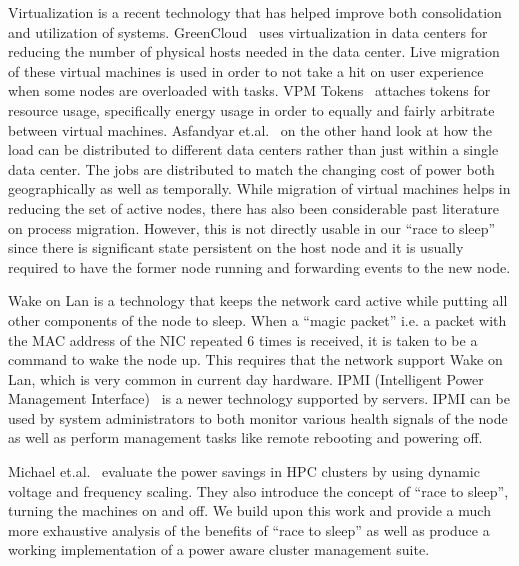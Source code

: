 Virtualization is a recent technology that has helped improve both consolidation and utilization of systems. GreenCloud~\cite{Liu:09} uses virtualization in data centers for reducing the number of physical hosts needed in the data center. Live migration of these virtual machines is used in order to not take a hit on user experience when some nodes are overloaded with tasks. VPM Tokens~\cite{Ripal:08} attaches tokens for resource usage, specifically energy usage in order to equally and fairly arbitrate between virtual machines. Asfandyar et.al.~\cite{Asfandyar:09} on the other hand look at how the load can be distributed to different data centers rather than just within a single data center. The jobs are distributed to match the changing cost of power both geographically as well as temporally. While migration of virtual machines helps in reducing the set of active nodes, there has also been considerable past literature~\cite{tcpcp, mosix} on process migration. However, this is not directly usable in our ``race to sleep'' since there is significant state persistent on the host node and it is usually required to have the former node running and forwarding events to the new node.

Wake on Lan\cite{wol,irwt} is a technology that keeps the network card active while putting all other components of the node to sleep. When a ``magic packet'' i.e. a packet with the MAC address of the NIC repeated 6 times is received, it is taken to be a command to wake the node up. This requires that the network support Wake on Lan, which is very common in current day hardware. IPMI (Intelligent Power Management Interface)~\cite{ipmi} is a newer technology supported by servers. IPMI can be used by system administrators to both monitor various health signals of the node as well as perform management tasks like remote rebooting and powering off.

Michael et.al.~\cite{Michael:09} evaluate the power savings in HPC clusters by using dynamic voltage and frequency scaling. They also introduce the concept of ``race to sleep'', turning the machines on and off. We build upon this work and provide a much more exhaustive analysis of the benefits of ``race to sleep'' as well as produce a working implementation of a power aware cluster management suite.



